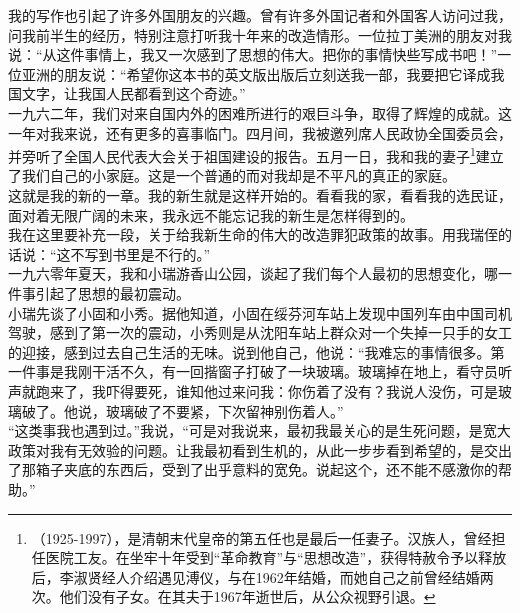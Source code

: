 我的写作也引起了许多外国朋友的兴趣。曾有许多外国记者和外国客人访问过我，问我前半生的经历，特别注意打听我十年来的改造情形。一位拉丁美洲的朋友对我说：“从这件事情上，我又一次感到了思想的伟大。把你的事情快些写成书吧！”一位亚洲的朋友说：“希望你这本书的英文版出版后立刻送我一部，我要把它译成我国文字，让我国人民都看到这个奇迹。”\\

一九六二年，我们对来自国内外的困难所进行的艰巨斗争，取得了辉煌的成就。这一年对我来说，还有更多的喜事临门。四月间，我被邀列席人民政协全国委员会，并旁听了全国人民代表大会关于祖国建设的报告。五月一日，我和我的妻子\footnote{（1925-1997），是清朝末代皇帝的第五任也是最后一任妻子。汉族人，曾经担任医院工友。在坐牢十年受到“革命教育”与“思想改造”，获得特赦令予以释放后，李淑贤经人介绍遇见溥仪，与在1962年结婚，而她自己之前曾经结婚两次。他们没有子女。在其夫于1967年逝世后，从公众视野引退。}建立了我们自己的小家庭。这是一个普通的而对我却是不平凡的真正的家庭。\\

这就是我的新的一章。我的新生就是这样开始的。看看我的家，看看我的选民证，面对着无限广阔的未来，我永远不能忘记我的新生是怎样得到的。\\

我在这里要补充一段，关于给我新生命的伟大的改造罪犯政策的故事。用我瑞侄的话说：“这不写到书里是不行的。”\\

一九六零年夏天，我和小瑞游香山公园，谈起了我们每个人最初的思想变化，哪一件事引起了思想的最初震动。\\

小瑞先谈了小固和小秀。据他知道，小固在绥芬河车站上发现中国列车由中国司机驾驶，感到了第一次的震动，小秀则是从沈阳车站上群众对一个失掉一只手的女工的迎接，感到过去自己生活的无味。说到他自己，他说：“我难忘的事情很多。第一件事是我刚干活不久，有一回揩窗子打破了一块玻璃。玻璃掉在地上，看守员听声就跑来了，我吓得要死，谁知他过来问我：你伤着了没有？我说人没伤，可是玻璃破了。他说，玻璃破了不要紧，下次留神别伤着人。”\\

“这类事我也遇到过。”我说，“可是对我说来，最初我最关心的是生死问题，是宽大政策对我有无效验的问题。让我最初看到生机的，从此一步步看到希望的，是交出了那箱子夹底的东西后，受到了出乎意料的宽免。说起这个，还不能不感激你的帮助。”\\

